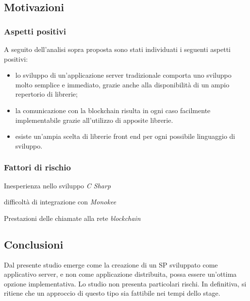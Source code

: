 \subsection{Motivazioni}
\subsubsection{Aspetti positivi}
A seguito dell’analisi sopra proposta sono stati individuati i seguenti aspetti positivi:
\begin{itemize}
    \item lo sviluppo di un’applicazione server tradizionale comporta uno sviluppo molto semplice e immediato, grazie anche alla disponibilità di un ampio repertorio di librerie;
    \item la comunicazione con la blockchain risulta in ogni caso facilmente implementabile grazie all’utilizzo di apposite librerie.
    \item esiste un’ampia scelta di librerie front end per ogni possibile linguaggio di sviluppo.
\end{itemize}
    
\subsubsection{Fattori di rischio}
\begin{risk}{Inesperienza nello sviluppo \emph{C Sharp}}
    \label{risk:c-sharp-inex} 
\end{risk}
\begin{risk}{difficoltà di integrazione con \emph{Monokee}}
    \label{risk:monokee-complex} 
\end{risk}
\begin{risk}{Prestazioni delle chiamate alla rete \emph{blockchain}}
    \label{risk:bc-performance} 
\end{risk}
\subsection{Conclusioni}
Dal presente studio emerge come la creazione di un SP sviluppato come applicativo server, e non come applicazione distribuita, possa essere un’ottima opzione implementativa. Lo studio non presenta particolari rischi. In definitiva, si ritiene che un approccio di questo tipo sia fattibile nei tempi dello stage.

